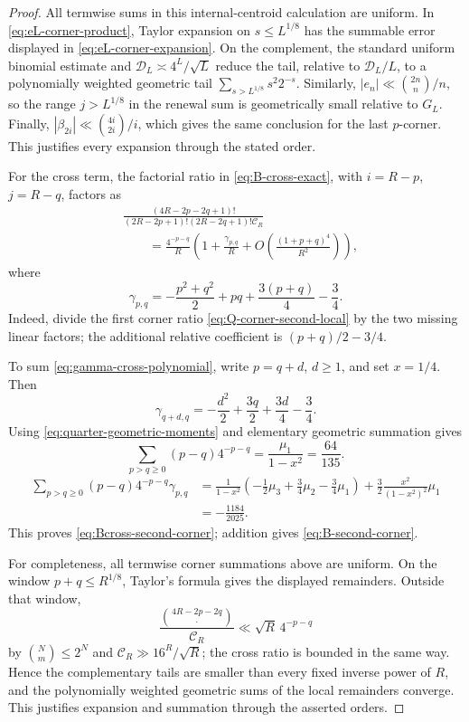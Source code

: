 \documentclass[11pt]{article}
\theoremstyle{definition}
\theoremstyle{remark}
\begin{document}
\begin{proof}
All termwise sums in this internal-centroid calculation are uniform.  In
\eqref{eq:eL-corner-product}, Taylor expansion on
\(s\le L^{1/8}\) has the summable error displayed in
\eqref{eq:eL-corner-expansion}.  On the complement, the standard uniform
binomial estimate and \(\mathscr D_L\asymp4^L/\sqrt L\) reduce the tail,
relative to \(\mathscr D_L/L\), to a polynomially weighted geometric
tail \(\sum_{s>L^{1/8}}s^2 2^{-s}\).  Similarly,
\(|e_n|\ll\binom{2n}{n}/n\), so the range \(j>L^{1/8}\) in the renewal
sum is geometrically small relative to \(G_L\).  Finally,
\(|\beta_{2i}|\ll\binom{4i}{2i}/i\), which gives the same conclusion for
the last \(p\)-corner.  This justifies every expansion through the stated
order.

For the cross term, the factorial ratio in \eqref{eq:B-cross-exact}, with
\(i=R-p\), \(j=R-q\), factors as
\begin{align}
 &\frac{(4R-2p-2q+1)!}
 {(2R-2p+1)!(2R-2q+1)!\mathscr C_R}\nonumber\\
 &\qquad=
 \frac{4^{-p-q}}R\left(
 1+\frac{\gamma_{p,q}}R
 +O\!\left(\frac{(1+p+q)^4}{R^2}\right)\right),
 \label{eq:cross-corner-local-second}
\end{align}
where
\begin{equation}
 {
 \gamma_{p,q}
 =-\frac{p^2+q^2}{2}+pq+\frac{3(p+q)}4-\frac34.}
 \label{eq:gamma-cross-polynomial}
\end{equation}
Indeed, divide the first corner ratio
\eqref{eq:Q-corner-second-local} by the two missing linear factors; the
additional relative coefficient is \((p+q)/2-3/4\).

To sum \eqref{eq:gamma-cross-polynomial}, write \(p=q+d\), \(d\ge1\),
and set \(x=1/4\).  Then
\[
 \gamma_{q+d,q}
 =-\frac{d^2}{2}+\frac{3q}{2}+\frac{3d}{4}-\frac34.
\]
Using \eqref{eq:quarter-geometric-moments} and elementary geometric
summation gives
\begin{equation}
 \sum_{p>q\ge0}(p-q)4^{-p-q}
 =\frac{\mu_1}{1-x^2}=\frac{64}{135}.
 \label{eq:cross-leading-geometric-sum}
\end{equation}
\begin{align}
 \sum_{p>q\ge0}(p-q)4^{-p-q}\gamma_{p,q}
 &=\frac1{1-x^2}
 \left(-\frac12\mu_3+\frac34\mu_2-\frac34\mu_1\right)
 +\frac32\frac{x^2}{(1-x^2)^2}\mu_1\nonumber\\
 &=-\frac{1184}{2025}.
 \label{eq:cross-second-geometric-sum}
\end{align}
This proves \eqref{eq:Bcross-second-corner}; addition gives
\eqref{eq:B-second-corner}.

For completeness, all termwise corner summations above are uniform.  On
the window \(p+q\le R^{1/8}\), Taylor's formula gives the displayed
remainders.  Outside that window,
\[
 \frac{\binom{4R-2p-2q}{\,\cdot\,}}{\mathscr C_R}
 \ll \sqrt R\,4^{-p-q}
\]
by \(\binom Nm\le2^N\) and
\(\mathscr C_R\gg16^R/\sqrt R\); the cross ratio is bounded in the same
way.  Hence the complementary tails are smaller than every fixed inverse
power of \(R\), and the polynomially weighted geometric sums of the local
remainders converge.  This justifies expansion and summation through the
asserted orders.
\end{proof}
\end{document}
